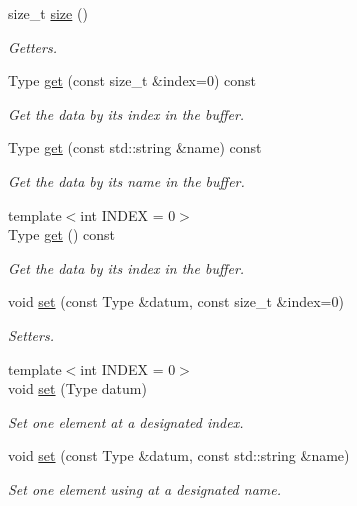 \begin{DoxyCompactItemize}
size\+\_\+t \hyperlink{classreal__time__tools_1_1SingletypeThreadsafeObject_af09735c0e632800487bc50e4f2f7f512}{size} ()
\begin{DoxyCompactList}\small\item\em Getters. \end{DoxyCompactList}\item 
Type \hyperlink{classreal__time__tools_1_1SingletypeThreadsafeObject_adcad6fcb86463b85ce7e18260b20712e}{get} (const size\+\_\+t \&index=0) const
\begin{DoxyCompactList}\small\item\em Get the data by its index in the buffer. \end{DoxyCompactList}\item 
Type \hyperlink{classreal__time__tools_1_1SingletypeThreadsafeObject_a5b30ba4b12d1d28d23b01dec4ae3c918}{get} (const std\+::string \&name) const
\begin{DoxyCompactList}\small\item\em Get the data by its name in the buffer. \end{DoxyCompactList}\item 
{\footnotesize template$<$int I\+N\+D\+EX = 0$>$ }\\Type \hyperlink{classreal__time__tools_1_1SingletypeThreadsafeObject_a7c56d14b8e1526cf6f16bce644f09849}{get} () const
\begin{DoxyCompactList}\small\item\em Get the data by its index in the buffer. \end{DoxyCompactList}\item 
void \hyperlink{classreal__time__tools_1_1SingletypeThreadsafeObject_a6d09deb1c28dcddee0a3986184af7bd5}{set} (const Type \&datum, const size\+\_\+t \&index=0)
\begin{DoxyCompactList}\small\item\em Setters. \end{DoxyCompactList}\item 
{\footnotesize template$<$int I\+N\+D\+EX = 0$>$ }\\void \hyperlink{classreal__time__tools_1_1SingletypeThreadsafeObject_a1f852a4b68d3a0ff112cb9c5d7c6b33e}{set} (Type datum)
\begin{DoxyCompactList}\small\item\em Set one element at a designated index. \end{DoxyCompactList}\item 
void \hyperlink{classreal__time__tools_1_1SingletypeThreadsafeObject_ab5776496cf4fa4a015101c81811eb9fc}{set} (const Type \&datum, const std\+::string \&name)
\begin{DoxyCompactList}\small\item\em Set one element using at a designated name. \end{DoxyCompactList}\end{DoxyCompactItemize}
